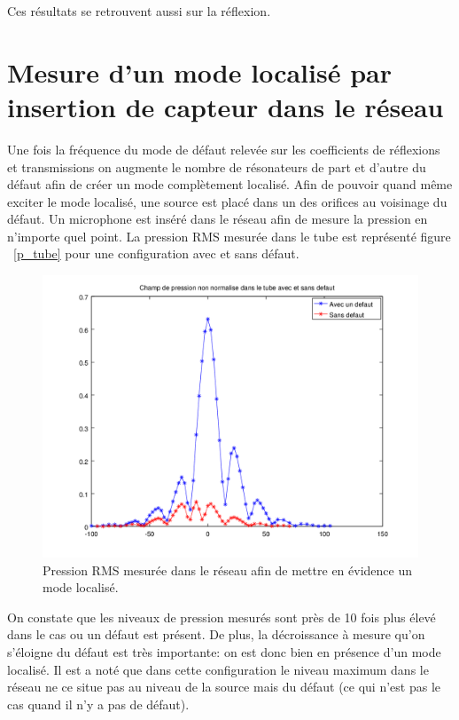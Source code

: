 Ces résultats se retrouvent aussi sur la réflexion.
%

\section{Mesure d'un mode localisé par insertion de capteur dans le réseau}



Une fois la fréquence du mode de défaut relevée sur les coefficients de réflexions et transmissions on augmente le nombre de résonateurs de part et d'autre du défaut afin de créer un mode complètement localisé. Afin de pouvoir quand même exciter le mode localisé, une source est placé dans un des orifices au voisinage du défaut. Un microphone est inséré dans le réseau afin de mesure la pression en n'importe quel point. La pression RMS mesurée dans le tube est représenté figure ~\ref{p_tube} pour une configuration avec et sans défaut.

\begin{figure}[!h]
\centering
\includegraphics[scale=0.5]{./images_chp3/non_norm_lin.png}
\caption{\label{_tube} Pression RMS mesurée dans le réseau afin de mettre en évidence un mode localisé.}
\end{figure}

On constate que les niveaux de pression mesurés sont près de 10 fois plus élevé dans le cas ou un défaut est présent. De plus, la décroissance à mesure qu'on s'éloigne du défaut est très importante: on est donc bien en présence d'un mode localisé. Il est a noté que dans cette configuration le niveau maximum dans le réseau ne ce situe pas au niveau de la source mais du défaut (ce qui n'est pas le cas quand il n'y a pas de défaut).
